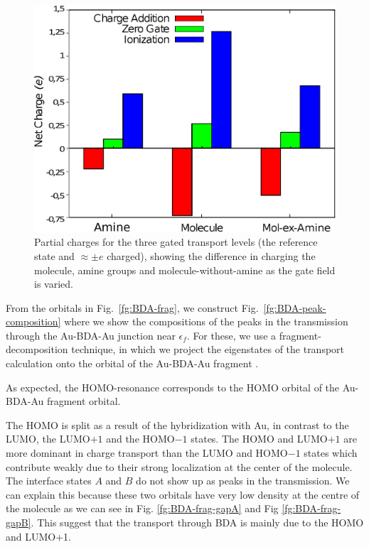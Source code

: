 \documentclass[aip,jcp,a4paper,reprint,floatfix,superscriptaddress]{revtex4-1}
\begin{document}
\begin{figure}
\includegraphics[width=.8\columnwidth]{img/gating-BDA-GGA-N}
\caption{Partial charges for the three gated transport levels (the reference state and $\approx\pm e$ charged), showing the difference in charging the molecule, amine groups and molecule-without-amine as the gate field is varied.} \label{fg:gated_charges_BDA}
\end{figure}

From the orbitals in Fig.~\ref{fg:BDA-frag},  we construct Fig.~\ref{fg:BDA-peak-composition} where we show the compositions of the peaks in the transmission through the Au-BDA-Au junction near $\epsilon_{f}$. For these, we use a fragment-decomposition technique, in which we project the eigenstates of the transport calculation onto the orbital of the Au-BDA-Au fragment \cite{Verzijl2012}. 

As expected, the HOMO-resonance corresponds to the HOMO orbital of the  Au-BDA-Au fragment orbital.

The HOMO is split as a result of the hybridization with Au, in contrast to the LUMO, the LUMO$+1$ and the HOMO$-1$ states. The HOMO and LUMO$+1$ are more dominant in charge transport than the LUMO and HOMO$-1$ states which contribute weakly due to their strong localization at the center of the molecule. The interface states ${A}$ and ${B}$ do not show up as peaks in the transmission. We can explain this because these two orbitals have very low density at the centre of the molecule as we can see in Fig. \ref{fg:BDA-frag-gapA} and Fig \ref{fg:BDA-frag-gapB}. This suggest that the transport through BDA is mainly due to the HOMO and LUMO+1. 
\end{document}
